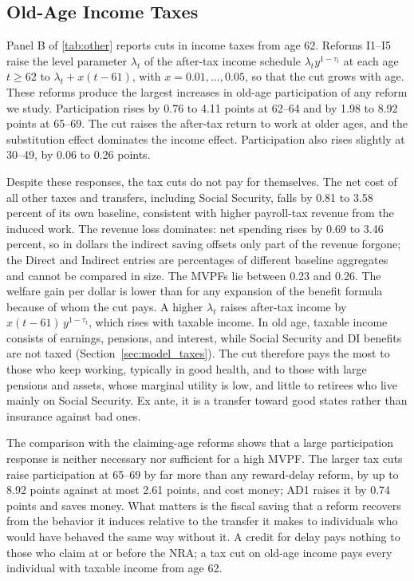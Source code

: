 \subsection{Old-Age Income Taxes}\label{sec:results_tax}

Panel B of \autoref{tab:other} reports cuts in income taxes from age 62. Reforms I1--I5 raise the level parameter $\lambda_t$ of the after-tax income schedule $\lambda_t y^{1-\tau_t}$ at each age $t\geq 62$ to $\lambda_t+x(t-61)$, with $x=0.01,\ldots,0.05$, so that the cut grows with age. These reforms produce the largest increases in old-age participation of any reform we study. Participation rises by 0.76 to 4.11 points at 62--64 and by 1.98 to 8.92 points at 65--69. The cut raises the after-tax return to work at older ages, and the substitution effect dominates the income effect. Participation also rises slightly at 30--49, by 0.06 to 0.26 points.

Despite these responses, the tax cuts do not pay for themselves. The net cost of all other taxes and transfers, including Social Security, falls by 0.81 to 3.58 percent of its own baseline, consistent with higher payroll-tax revenue from the induced work. The revenue loss dominates: net spending rises by 0.69 to 3.46 percent, so in dollars the indirect saving offsets only part of the revenue forgone; the Direct and Indirect entries are percentages of different baseline aggregates and cannot be compared in size. The MVPFs lie between 0.23 and 0.26. The welfare gain per dollar is lower than for any expansion of the benefit formula because of whom the cut pays. A higher $\lambda_t$ raises after-tax income by $x(t-61)\,y^{1-\tau_t}$, which rises with taxable income. In old age, taxable income consists of earnings, pensions, and interest, while Social Security and DI benefits are not taxed (Section~\ref{sec:model_taxes}). The cut therefore pays the most to those who keep working, typically in good health, and to those with large pensions and assets, whose marginal utility is low, and little to retirees who live mainly on Social Security. Ex ante, it is a transfer toward good states rather than insurance against bad ones.

The comparison with the claiming-age reforms shows that a large participation response is neither necessary nor sufficient for a high MVPF. The larger tax cuts raise participation at 65--69 by far more than any reward-delay reform, by up to 8.92 points against at most 2.61 points, and cost money; AD1 raises it by 0.74 points and saves money. What matters is the fiscal saving that a reform recovers from the behavior it induces relative to the transfer it makes to individuals who would have behaved the same way without it. A credit for delay pays nothing to those who claim at or before the NRA; a tax cut on old-age income pays every individual with taxable income from age 62.

